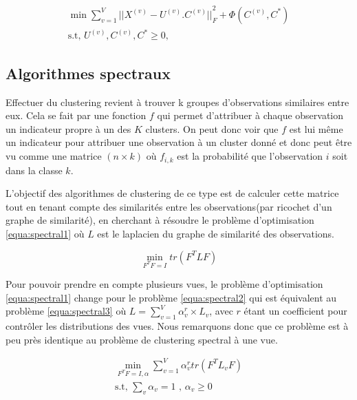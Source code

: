 \documentclass[12pt, french, latin.medieval, a4paper]{report}
\begin{document}
        	\begin{equation}
             	\begin{aligned}
                	\min {\sum_{v=1}^{V} {|| X^{(v)} - U^{(v)}.C^{(v)} ||}_F^2 + \Phi(C^{(v)}, C^{*})} \\
                	\text{s.t, $U^{(v)},C^{(v)},C^{*} \geq 0$,}
            	\end{aligned}
            	\label{equa:nmf}
        	\end{equation}
            
        \subsection{Algorithmes spectraux}
            Effectuer du clustering revient à trouver k groupes d'observations similaires entre eux. Cela se fait par une fonction $f$ qui permet d'attribuer à chaque observation un indicateur propre à un des $K$ clusters. On peut donc voir que $f$ est lui même un indicateur pour attribuer une observation à un cluster donné et donc peut être vu comme une matrice $(n \times k)$ où $f_{i,k}$ est la probabilité que l'observation $i$ soit dans la classe $k$.
            
            L'objectif des algorithmes de clustering de ce type est de calculer cette matrice tout en tenant compte des similarités entre les observations(par ricochet d'un graphe de similarité), en cherchant à résoudre le problème d'optimisation \ref{equa:spectral1} où $L$ est le laplacien du graphe de similarité des observations.
        
            \begin{equation}
                \min_{F^{T}F = I} tr(F^{T}LF)
                \label{equa:spectral1}
            \end{equation}


            Pour pouvoir prendre en compte plusieurs vues, le problème d'optimisation \ref{equa:spectral1} change pour le problème \ref{equa:spectral2} qui est équivalent au problème \ref{equa:spectral3} où $L = \sum_{v=1}^{V} \alpha_{v}^{r} \times L_{v}$, avec $r$ étant un coefficient pour contrôler les distributions des vues. Nous remarquons donc que ce problème est à peu près identique au problème de clustering spectral à une vue.
    
            \begin{equation}
                \begin{aligned}
                    \min_{F^{T}F = I, \alpha} \sum_{v=1}^{V} \alpha_{v}^{r} tr(F^{T}L_{v}F) \\
                    \text{s.t, } \sum_{v} \alpha_{v} = 1 \text{ , } \alpha_{v} \geq 0
                \end{aligned}
                \label{equa:spectral2}
            \end{equation}
    
\end{document}
